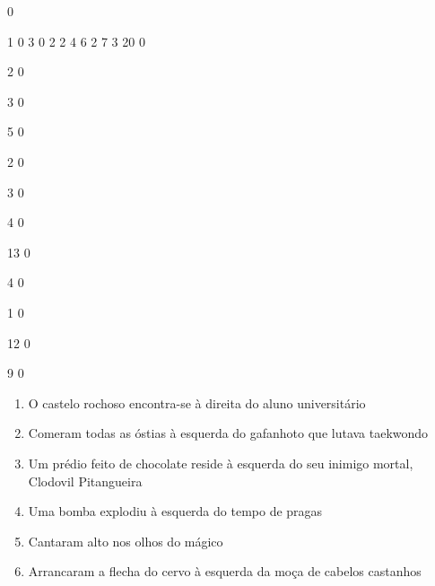 \documentclass[12pt]{article}
\begin{document}
		\vfill  
		  
{
	0	%

	1	%
	0	%
	3	%
	0	%
	2	%
	2	%
	4	%
	6	%
	2	%
	7	%
	3	%
	20	%
	0	%

	2	%
	0	%

	3	%
	0	%

	5	%
	0	%

	2	%
	0	%

	3	%
	0	%

	4	%
	0	%

	13	%
	0	%

	4	%
	0	%

	1	%
	0	%

	12	%
	0	%

	9	%
	0	%

}	  
		    	

		 

\pagebreak


	\begin{enumerate}
		  \sffamily %
		  \large %


\vfill \item
O castelo rochoso encontra-se	%
à direita
do aluno universitário	%

\vfill \item
Comeram todas as óstias	%
à esquerda
do gafanhoto que lutava taekwondo	%

\vfill \item
Um prédio feito de chocolate reside	%
à esquerda
do seu inimigo mortal, Clodovil Pitangueira	%

\vfill \item
Uma bomba explodiu	%
à esquerda
do tempo de pragas	%

\vfill \item
Cantaram alto	%
nos olhos do mágico	%

\vfill \item
Arrancaram a flecha do cervo	%
à esquerda
da moça de cabelos castanhos	%
	\end{enumerate}
		  
		  \hfill

		  \vfill
\end{document}
